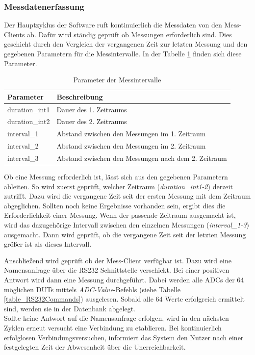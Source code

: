  
\subsubsection{Messdatenerfassung}

Der Hauptzyklus der Software ruft kontinuierlich die Messdaten von den Mess-Clients ab. Dafür wird ständig geprüft ob Messungen erforderlich sind. Dies geschieht durch den Vergleich der vergangenen Zeit zur letzten Messung und den gegebenen Parametern für die Messintervalle. In der Tabelle \ref{table_ParameterMessintervalle} finden sich diese Parameter.\\


\begin{table}[H]
\begin{center}
\begin{tabular}{|l|l|}\hline
Parameter & Beschreibung \\ \hline
duration\_int1 & Dauer des 1. Zeitraums\\  \hline
duration\_int2 & Dauer des 2. Zeitraums\\  \hline
interval\_1 & Abstand zwischen den Messungen im 1. Zeitraum\\  \hline
interval\_2 & Abstand zwischen den Messungen im 2. Zeitraum\\  \hline
interval\_3 & Abstand zwischen den Messungen nach dem 2. Zeitraum\\ \hline
\end{tabular}
\caption{Parameter der Messintervalle}
\label{table_ParameterMessintervalle}
\end{center}
\end{table}


Ob eine Messung erforderlich ist, lässt sich aus den gegebenen Parametern ableiten. So wird zuerst geprüft, welcher Zeitraum (\textit{duration\_int1-2}) derzeit zutrifft. Dazu wird die vergangene Zeit seit der ersten Messung mit dem Zeitraum abgeglichen. Sollten noch keine Ergebnisse vorhanden sein, ergibt dies die Erforderlichkeit einer Messung. Wenn der passende Zeitraum ausgemacht ist, wird das dazugehörige Intervall zwischen den einzelnen Messungen (\textit{interval\_1-3}) ausgemacht. Dann wird geprüft, ob die vergangene Zeit seit der letzten Messung größer ist als dieses Intervall.\ 

Anschließend wird geprüft ob der Mess-Client verfügbar ist. Dazu wird eine Namensanfrage über die RS232 Schnittstelle verschickt. Bei einer positiven Antwort wird dann eine Messung durchgeführt. Dabei werden alle \acp{ADC} der 64 möglichen \acp{DUT} mittels \textit{ADC-Value}-Befehls (siehe Tabelle \ref{table_RS232Commands}) ausgelesen. Sobald alle 64 Werte erfolgreich ermittelt sind, werden sie in der Datenbank abgelegt. \\
Sollte keine Antwort auf die Namensanfrage erfolgen, wird in den nächsten Zyklen erneut versucht eine Verbindung zu etablieren. Bei kontinuierlich erfolglosen Verbindungsversuchen, informiert das System den Nutzer nach einer festgelegten Zeit der Abwesenheit über die Unerreichbarkeit.
 

